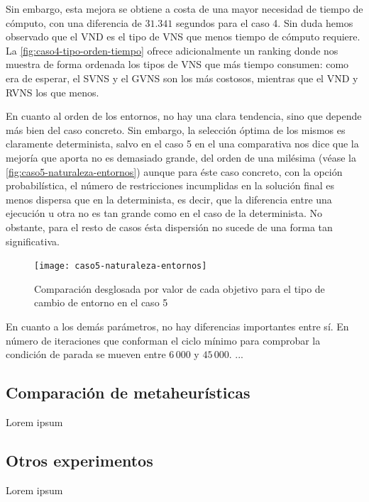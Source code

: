 Sin embargo, esta mejora se obtiene a costa de una mayor necesidad de tiempo de cómputo, con una diferencia de $31.341$ segundos para el caso 4. Sin duda hemos observado que el VND es el tipo de VNS que menos tiempo de cómputo requiere. La \autoref{fig:caso4-tipo-orden-tiempo} ofrece adicionalmente un ranking donde nos muestra de forma ordenada los tipos de VNS que más tiempo consumen: como era de esperar, el SVNS y el GVNS son los más costosos, mientras que el VND y RVNS los que menos.

En cuanto al orden de los entornos, no hay una clara tendencia, sino que depende más bien del caso concreto. Sin embargo, la selección óptima de los mismos es claramente determinista, salvo en el caso 5 %
en el una comparativa nos dice que la mejoría que aporta no es demasiado grande, del orden de una milésima (véase la \autoref{fig:caso5-naturaleza-entornos}) aunque para éste caso concreto, con la opción probabilística, el número de restricciones incumplidas en la solución final es menos dispersa que en la determinista, es decir, que la diferencia entre una ejecución u otra no es tan grande como en el caso de la determinista. No obstante, para el resto de casos ésta dispersión no sucede de una forma tan significativa.

\begin{figure}
	\centering
	\texttt{[image: caso5-naturaleza-entornos]}
	\caption{Comparación desglosada por valor de cada objetivo para el tipo de cambio de entorno en el caso 5}
	\label{fig:caso5-naturaleza-entornos}
\end{figure}


En cuanto a los demás parámetros, no hay diferencias importantes entre sí. En número de iteraciones que conforman el ciclo mínimo para comprobar la condición de parada se mueven entre $6\,000$ y $45\,000$. ... %




\subsection{Comparación de metaheurísticas}
Lorem ipsum

\subsection{Otros experimentos}
Lorem ipsum
